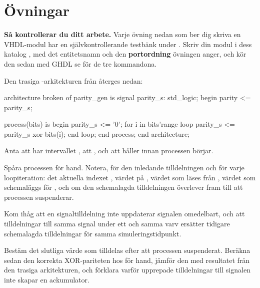 
\section{Övningar}
\label{c5:sec:exercises}

\begin{aside}
\textbf{Så kontrollerar du ditt arbete.} Varje övning nedan som ber dig skriva en VHDL-modul har en
självkontrollerande testbänk under . Skriv din modul i dess katalog
, med det entitetsnamn och den \textbf{portordning} övningen anger, och
kör den sedan med GHDL \textemdash{} se  för de tre kommandona.
\end{aside}


\label{c5:ex:trace}
Den trasiga -arkitekturen från  återges nedan:

\begin{vhdlcode}
architecture broken of parity_gen is
signal parity_s: std_logic;
begin
    parity <= parity_s;

    process(bits) is
    begin
        parity_s <= '0';
        for i in bits'range loop
            parity_s <= parity_s xor bits(i);
        end loop;
    end process;
end architecture;
\end{vhdlcode}

Anta att  har intervallet , att , och att
 håller  innan processen börjar.

 Spåra processen för hand. Notera, för den inledande tilldelningen och för varje
loopiteration: det aktuella indexet , värdet på , värdet som läses från
, värdet som schemaläggs för , och om den schemalagda tilldelningen
överlever fram till att processen suspenderar.

Kom ihåg att en signaltilldelning inte uppdaterar signalen omedelbart, och att tilldelningar till
samma signal under ett och samma varv ersätter tidigare schemalagda tilldelningar för samma
simuleringstidpunkt.

 Bestäm det slutliga värde som tilldelas  efter att processen suspenderat.
Beräkna sedan den korrekta XOR-pariteten hos  för hand, jämför den med resultatet
från den trasiga arkitekturen, och förklara varför upprepade tilldelningar till signalen inte
skapar en ackumulator.

